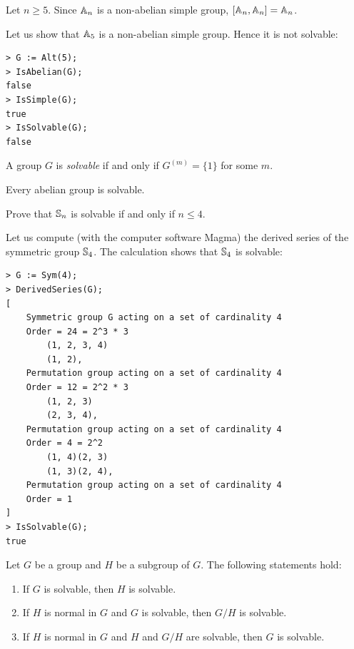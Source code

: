 \begin{example}
    Let $n\geq5$. Since $\mathbb{A}_n$ is a non-abelian simple group, 
    $[\mathbb{A}_n,\mathbb{A}_n]=\mathbb{A}_n$. 
\end{example}

Let us show that $\mathbb{A}_5$ is a non-abelian simple group. Hence
it is not solvable: 
\begin{lstlisting}
> G := Alt(5);
> IsAbelian(G);
false
> IsSimple(G);
true
> IsSolvable(G);
false
\end{lstlisting}


\begin{definition}
    A group $G$ is \emph{solvable} if and only if
    $G^{(m)}=\{1\}$ for some $m$. 
\end{definition}

Every abelian group is solvable. 

\begin{exercise}
    Prove that $\mathbb{S}_n$ is solvable if and only if $n\leq4$. 
\end{exercise}

Let us compute (with the computer software Magma) 
the derived series of the symmetric group
$\mathbb{S}_4$. The calculation shows that $\mathbb{S}_4$ is solvable: 
\begin{lstlisting}
> G := Sym(4);
> DerivedSeries(G);
[
    Symmetric group G acting on a set of cardinality 4
    Order = 24 = 2^3 * 3
        (1, 2, 3, 4)
        (1, 2),
    Permutation group acting on a set of cardinality 4
    Order = 12 = 2^2 * 3
        (1, 2, 3)
        (2, 3, 4),
    Permutation group acting on a set of cardinality 4
    Order = 4 = 2^2
        (1, 4)(2, 3)
        (1, 3)(2, 4),
    Permutation group acting on a set of cardinality 4
    Order = 1
]
> IsSolvable(G);
true
\end{lstlisting}


\begin{proposition}
\label{pro:solvable}
    Let $G$ be a group and $H$ be a subgroup of $G$. 
    The following statements hold:
    \begin{enumerate}
        \item If $G$ is solvable, then $H$ is solvable.
        \item If $H$ is normal in $G$ and $G$ is solvable, then $G/H$ is solvable. 
        \item If $H$ is normal in $G$ and $H$ and $G/H$ are solvable, then $G$ is solvable. 
    \end{enumerate}
\end{proposition}

